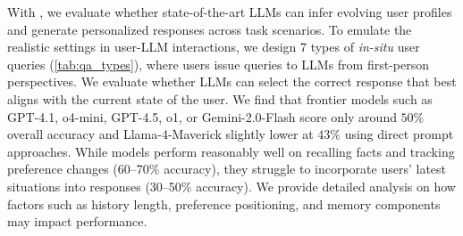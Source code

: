 With \datasetnameemoji, we evaluate whether state-of-the-art LLMs can infer evolving user profiles and generate personalized responses across task scenarios. To emulate the realistic settings in user-LLM interactions, we design 7 types of \textit{in-situ} user queries (\autoref{tab:qa_types}), where users issue queries to LLMs from first-person perspectives. We evaluate whether LLMs can select the correct response that best aligns with the current state of the user. We find that frontier models such as GPT-4.1, o4-mini, GPT-4.5, o1, or Gemini-2.0-Flash score only around $50\%$ overall accuracy and Llama-4-Maverick slightly lower at $43\%$ using direct prompt approaches.
While models perform reasonably well on recalling facts and tracking preference changes (60–70\% accuracy), they struggle to incorporate users’ latest situations into responses (30–50\% accuracy). We provide detailed analysis on how factors such as history length, preference positioning, and memory components may impact performance.


